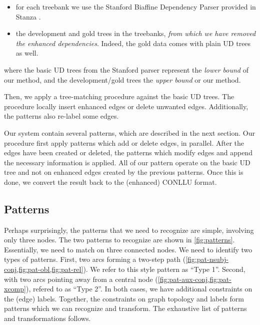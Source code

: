 \documentclass[11pt,a4paper]{article}
\begin{document}
\begin{itemize}
\item for each treebank we use the Stanford Biaffine Dependency
Parser \citep{dozat2016deep} provided in Stanza
\citep{qi2020stanza}.
\item the development and gold trees in the treebanks, \emph{from
    which we have removed the enhanced dependencies}. Indeed, the gold
  data comes with plain UD trees as well.
\end{itemize}

where the basic UD trees from the Stanford parser represent the
\emph{lower bound} of our method, and the development/gold trees
the \emph{upper bound} or our method.

%    
Then, we apply a tree-matching procedure against the basic UD
trees. The procedure locally insert enhanced edges or delete
unwanted edges. Additionally, the patterns also re-label some
edges.

Our system contain several patterns, which are described in the
next section. Our procedure first apply patterns which add or
delete edges, in parallel. After the edges have been created or
deleted, the patterns which modify edges and append the necessary
information is applied. All of our pattern operate on the basic
UD tree and not on enhanced edges created by the previous
patterns.  Once this is done, we convert the result back to the
(enhanced) CONLLU format.
    


\subsection{Patterns}

Perhaps surprisingly, the patterns that we need to recognize are
simple, involving only three nodes. The two patterns to recognize
are shown in \cref{fig:patterns}. Essentially, we need to match
on three connected nodes.  We need to identify two types of
patterns. First, two arcs forming a two-step path
(\cref{fig:pat-nsubj-conj,fig:pat-obl,fig:pat-rel}). We refer to
this style pattern as ``Type 1''.  Second, with two arcs pointing
away from a central node (\cref{fig:pat-aux-conj,fig:pat-xcomp}),
refered to as ``Type 2''.  In both cases, we have additional
constraints on the (edge) labels. Together, the constraints on
graph topology and labels form patterns which we can recognize
and transform.  The exhaustive list of patterns and
transformations follows.
\end{document}
